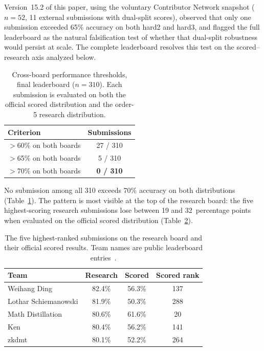 \documentclass[11pt]{article}
\begin{document}
Version~15.2 of this paper, using the voluntary Contributor Network
snapshot ($n{=}52$, 11 external submissions with dual-split scores),
observed that only one submission exceeded 65\% accuracy on both hard2
and hard3, and flagged the full leaderboard as the natural
falsification test of whether that dual-split robustness would persist
at scale. The complete leaderboard resolves this test on the
scored--research axis analyzed below.

\begin{table}[t]
\centering
\caption{Cross-board performance thresholds, final leaderboard
($n{=}310$). Each submission is evaluated on both the official scored
distribution and the order-5 research distribution.}
\label{tab:dualthreshold}
\begin{tabular}{lc}
\toprule
Criterion & Submissions \\
\midrule
$>$60\% on both boards & 27 / 310 \\
$>$65\% on both boards & 5 / 310 \\
$>$70\% on both boards & \textbf{0 / 310} \\
\bottomrule
\end{tabular}
\end{table}

No submission among all 310 exceeds 70\% accuracy on both distributions
(Table~\ref{tab:dualthreshold}). The pattern is most visible at the
top of the research board: the five highest-scoring research submissions
lose between 19 and 32~percentage points when evaluated on the official
scored distribution (Table~\ref{tab:researchcollapse}).

\begin{table}[t]
\centering
\caption{The five highest-ranked submissions on the research board and
their official scored results. Team names are public leaderboard
entries~\citep{sair2026leaderboard, sair2026leaderboardresearch}.}
\label{tab:researchcollapse}
\begin{tabular}{lccc}
\toprule
Team & Research & Scored & Scored rank \\
\midrule
Weihang Ding & 82.4\% & 56.3\% & 137 \\
Lothar Schiemanowski & 81.9\% & 50.3\% & 288 \\
Math Distillation & 80.6\% & 61.6\% & 20 \\
Ken & 80.4\% & 56.2\% & 141 \\
zkdmt & 80.1\% & 52.2\% & 264 \\
\bottomrule
\end{tabular}
\end{table}
\end{document}
